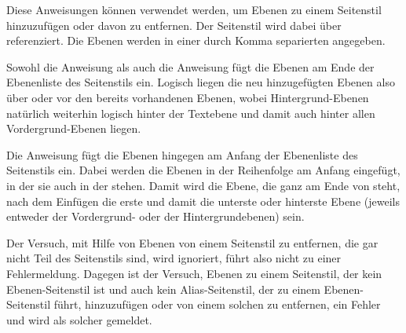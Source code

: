 \begin{Declaration}
\end{Declaration}
%
%
Diese Anweisungen können verwendet werden, um Ebenen zu einem Seitenstil
hinzuzufügen oder davon zu entfernen. Der Seitenstil wird dabei über
 referenziert. Die Ebenen werden in einer durch Komma
separierten  angegeben. 

Sowohl die Anweisung  als auch die Anweisung
 fügt die Ebenen
am Ende der Ebenenliste des Seitenstils ein. Logisch liegen die neu
hinzugefügten Ebenen also über oder vor den bereits vorhandenen Ebenen, wobei
Hintergrund-Ebenen natürlich weiterhin logisch hinter der Textebene und damit
auch hinter allen Vordergrund-Ebenen liegen.

Die Anweisung  fügt die Ebenen hingegen am Anfang der Ebenenliste des Seitenstils
ein. Dabei werden die Ebenen in der Reihenfolge am Anfang eingefügt, in der
sie auch in der  stehen. Damit wird die Ebene, die ganz am
Ende von  steht, nach dem Einfügen die erste und damit die
unterste oder hinterste Ebene (jeweils entweder der Vordergrund- oder der
Hintergrundebenen) sein.

\iffalse%
Die Anweisung \Macro{RemoveLayersFromPageStyle} dient dem genauen
Gegenteil. Sie entfernt\textnote{entfernen} die angegebenen Ebenen von
Seitenstil.%
\fi

Der Versuch, mit Hilfe von
 Ebenen von einem
Seitenstil zu entfernen, die gar nicht Teil des Seitenstils sind, wird
ignoriert, führt also nicht zu einer Fehlermeldung. Dagegen ist der Versuch,
Ebenen zu einem Seitenstil, der kein Ebenen-Seitenstil ist und auch kein
Alias-Seitenstil, der zu einem Ebenen-Seitenstil führt, hinzuzufügen oder von
einem solchen zu entfernen, ein Fehler und wird als solcher gemeldet.%
\EndIndexGroup


